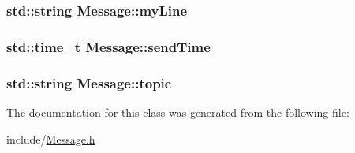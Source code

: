 \subsubsection[{\texorpdfstring{my\+Line}{myLine}}]{\setlength{\rightskip}{0pt plus 5cm}std\+::string Message\+::my\+Line}\hypertarget{classMessage_ab0da34659dcb20a9dbdb6cfc2a576789}{}\label{classMessage_ab0da34659dcb20a9dbdb6cfc2a576789}
\subsubsection[{\texorpdfstring{send\+Time}{sendTime}}]{\setlength{\rightskip}{0pt plus 5cm}std\+::time\+\_\+t Message\+::send\+Time}\hypertarget{classMessage_a45f77ab2cb5396474edb13ff74b93a14}{}\label{classMessage_a45f77ab2cb5396474edb13ff74b93a14}
\subsubsection[{\texorpdfstring{topic}{topic}}]{\setlength{\rightskip}{0pt plus 5cm}std\+::string Message\+::topic}\hypertarget{classMessage_a445d16a4d74aae5900362cf988c6b9d2}{}\label{classMessage_a445d16a4d74aae5900362cf988c6b9d2}


The documentation for this class was generated from the following file\+:\begin{DoxyCompactItemize}
\item 
include/\hyperlink{Message_8h}{Message.\+h}\end{DoxyCompactItemize}
